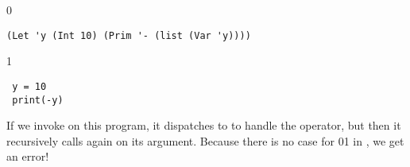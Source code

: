 \documentclass[7x10]{TimesAPriori_MIT}%
\def\racketEd{0}
\def\pythonEd{1}
\def\edition{1}
\newcommand{\racket}[1]{{\if\edition\racketEd{#1}\fi}}
\newcommand{\pythonColor}[0]{}
\newcommand{\python}[1]{{\if\edition\pythonEd\pythonColor #1\fi}}
\numberwithin{theorem}{chapter}
\numberwithin{definition}{chapter}
\numberwithin{equation}{chapter}
\begin{document}
{\if\edition\racketEd
\begin{lstlisting}
(Let 'y (Int 10) (Prim '- (list (Var 'y))))
\end{lstlisting}
\fi}
{\if\edition\pythonEd\pythonColor
\begin{minipage}{1.0\textwidth}
\begin{lstlisting}
 y = 10 
 print(-y)
\end{lstlisting}
\end{minipage}
\fi}

\noindent If we invoke  on this program, it
dispatches to  to handle the \code{-} operator, but
then it recursively calls  again on its argument.
Because there is no case for \racket{}\python{} in
, we get an error!
\end{document}

